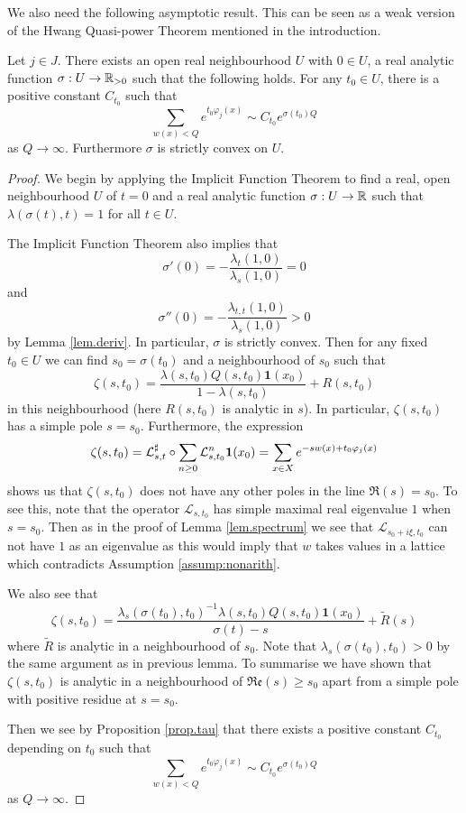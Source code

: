 \documentclass[12pt,a4paper,reqno]{amsart}
\begin{document}
We also need the following asymptotic result. This can be seen as a weak version of  the Hwang Quasi-power Theorem mentioned in the introduction.

\begin{proposition} Let $j \in J$.
There exists an  open real neighbourhood $U$ with $0 \in U$, a real analytic function $\sigma: U \to {\mathbb R}_{> 0}$ such that the following holds. For any $t_0 \in U$, there is a positive constant $C_{t_0}$  such that
\[
\sum_{w(x) < Q} e^{t_0 \varphi_j (x)}  \sim C_{t_0} e^{\sigma(t_0) Q}
\]
as $Q\to\infty$. Furthermore $\sigma$ is strictly convex on $U$.
\end{proposition}

\begin{proof}
We begin by applying the Implicit Function Theorem to find a real, open neighbourhood $U$ of $t=0$ and a real analytic function $\sigma : U \to {\mathbb R}$ such that $\lambda(\sigma(t),t) =1$ for all $t \in U$.

The Implicit Function Theorem also implies that
\[
\sigma'(0) =  - \frac{\lambda_t(1,0)}{\lambda_s(1,0)} = 0
\]
and 
\[
\sigma''(0)= - \frac{\lambda_{t,t}(1,0)}{\lambda_s(1,0)} > 0
\]
by Lemma \ref{lem.deriv}.
In particular,  $\sigma$ is strictly convex.
Then for any fixed $t_0\in U$ we can find $s_0 = \sigma(t_0)$ and a neighbourhood of $s_0$ such that
\begin{equation} 
\zeta(s,t_0) = \frac{ \lambda(s,t_0)Q(s,t_0)\textbf{1}(x_0)}{1-\lambda(s,t_0)} + R(s,t_0)
\end{equation}
in this neighbourhood (here $R(s,t_0)$ is analytic in $s$). In particular, $\zeta(s,t_0)$ has a simple pole $s = s_0$. Furthermore, the expression
\[
\zeta(s,t_0) = \mathcal{L}_{s,t}^\sharp \circ \sum_{n\ge 0} \mathcal{L}_{s,t_0}^n {\bf 1}(x_0) = \sum_{x \in X} e^{-sw(x) + t_0 \varphi_j(x)}
\]
shows us that $\zeta(s,t_0)$ does not have any other poles in the line $\Re(s) = s_0$. To see this, note that the operator $\mathcal{L}_{s,t_0}$ has simple maximal real eigenvalue $1$ when $s = s_0$. Then as in the proof of Lemma \ref{lem.spectrum} we see that $\mathcal{L}_{s_0 + i\xi, t_0}$ can not have $1$ as an eigenvalue as this would imply that $w$ takes values in a lattice which contradicts Assumption \ref{assump:nonarith}.

We also see that
\[
\zeta(s,t_0) =  \frac{\lambda_s(\sigma(t_0),t_0)^{-1} \lambda(s,t_0)Q(s,t_0)\textbf{1}(x_0)}{\sigma(t) - s} + \widetilde{R}(s)
\]
 where $\widetilde{R}$ is analytic in a neighbourhood of $s_0$. Note that $\lambda_s(\sigma(t_0),t_0) > 0$ by the same argument as in previous lemma.
 To summarise we have shown that $\zeta(s,t_0) $ is analytic in a neighbourhood of $\mathfrak{Re}(s) \ge s_0$ apart from a simple pole with positive residue at $s = s_0$.
 
Then we see by Proposition \ref{prop.tau} that there exists a positive constant $C_{t_0}$ depending on $t_0$ such that
\[
\sum_{w(x) < Q} e^{t_0 \varphi_j(x)}  \sim C_{t_0} e^{\sigma(t_0) Q}
\]
as $Q\to\infty$. 
\end{proof}
\end{document}
